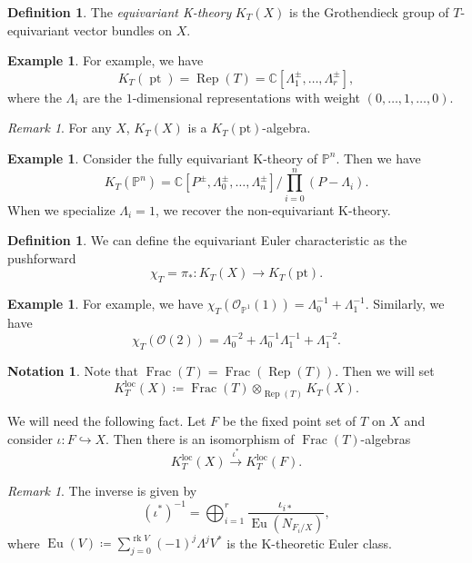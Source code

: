 \documentclass{amsart}
\theoremstyle{definition}
\newtheorem{defn}[thm]{Definition}
\newtheorem{exm}[thm]{Example}
\newtheorem{notn}[thm]{Notation}
\theoremstyle{remark}
\newtheorem{rmk}[thm]{Remark}
\theoremstyle{plain}
\theoremstyle{definition}
\theoremstyle{remark}
\newcommand{\C}{\mathbb{C}}
\renewcommand{\P}{\mathbb{P}}
\newcommand{\mc}[1]{\mathcal{#1}}
\newcommand{\mr}[1]{\mathrm{#1}}
\newcommand{\on}[1]{\operatorname{#1}}
\newcommand{\1}{\mathbf{1}}
\newcommand{\2}{\mathbf{2}}
\newcommand{\3}{\mathbf{3}}
\newcommand{\loc}{\mr{loc}}
\begin{document}
\begin{defn}
    The \textit{equivariant K-theory} \(K_T(X)\) is the Grothendieck group of \(T\)-equivariant vector bundles on \(X\).
\end{defn}

\begin{exm}
    For example, we have
    \[ K_T(\on{pt}) = \on{Rep}(T) = \C[\Lambda_1^{\pm}, \ldots, \Lambda_r^{\pm}], \]
    where the \(\Lambda_i\) are the \(1\)-dimensional representations with weight \((0, \ldots, 1, \ldots, 0)\).
\end{exm}

\begin{rmk}
    For any \(X\), \(K_T(X)\) is a \(K_T(\mr{pt})\)-algebra.
\end{rmk}

\begin{exm}
    Consider the fully equivariant K-theory of \(\P^n\). Then we have
    \[ K_T(\P^n) = \C[P^{\pm}, \Lambda_0^{\pm}, \ldots, \Lambda_n^{\pm}] \big/ \prod_{i=0}^n (P-\Lambda_i). \]
    When we specialize \(\Lambda_i = 1\), we recover the non-equivariant K-theory.
\end{exm}

\begin{defn}
    We can define the equivariant Euler characteristic as the pushforward
    \[ \chi_T = \pi_* \colon K_T(X) \to K_T(\mr{pt}). \]
\end{defn}

\begin{exm}
    For example, we have \(\chi_T(\mc{O}_{\P^1}(1)) = \Lambda_0^{-1} + \Lambda_1^{-1}\). Similarly, we have
    \[ \chi_T(\mc{O}(2)) = \Lambda_0^{-2} + \Lambda_0^{-1} \Lambda_1^{-1} + \Lambda_1^{-2}. \]
\end{exm}

\begin{notn}
    Note that \(\on{Frac}(T) = \on{Frac}(\on{Rep}(T))\). Then we will set
    \[ K_T^{\loc}(X) \coloneqq \on{Frac}(T) \otimes_{\on{Rep}(T)} K_T(X). \]
\end{notn}

We will need the following fact. Let \(F\) be the fixed point set of \(T\) on \(X\) and consider \(\iota \colon F \hookrightarrow X\). Then there is an isomorphism of \(\on{Frac}(T)\)-algebras
\[ K_T^{\loc}(X) \xrightarrow{\iota^*} K_T^{\loc}(F). \]

\begin{rmk}
    The inverse is given by
    \[ (\iota^*)^{-1} = \bigoplus_{i=1}^r \frac{\iota_{i*}}{\on{Eu}(N_{F_i/X})}, \]
    where \(\on{Eu}(V) \coloneqq \sum_{j = 0}^{\on{rk} V} (-1)^j \Lambda^j V^*\) is the K-theoretic Euler class.
\end{rmk}
\end{document}
